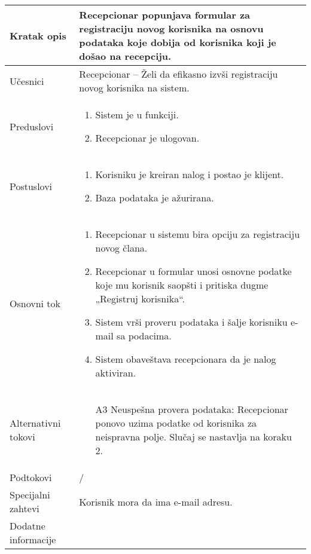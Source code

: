\documentclass[../main.tex]{subfiles}
\begin{document}
\begin{longtable}{| p{} | p{} |} 
\hline
    Kratak opis &  Recepcionar popunjava formular za registraciju novog korisnika na osnovu podataka koje dobija od korisnika koji je došao na recepciju.\\ 
\hline    
    Učesnici & 
         Recepcionar – Želi da efikasno izvši registraciju novog korisnika na sistem.
    \\
\hline
   Preduslovi & \begin{enumerate}
       \item Sistem je u funkciji.
       \item Recepcionar je ulogovan.
   \end{enumerate}\\
\hline  
    Postuslovi & \begin{enumerate}
        \item Korisniku je kreiran nalog i postao je klijent.
        \item Baza podataka je ažurirana.
    \end{enumerate}\\
\hline
    Osnovni tok & \begin{enumerate}
        \item Recepcionar u sistemu bira opciju za registraciju novog člana.
        \item Recepcionar u formular unosi osnovne podatke koje mu korisnik saopšti i pritiska dugme „Registruj korisnika“.
        \item Sistem vrši proveru podataka i šalje korisniku e-mail sa podacima.
        \item Sistem obaveštava recepcionara da je nalog aktiviran.
    \end{enumerate}\\
\hline
    Alternativni tokovi & \begin{itemize}
        \item[A3] Neuspešna provera podataka: Recepcionar ponovo uzima podatke od korisnika za neispravna polje. Slučaj se nastavlja na koraku 2.
    \end{itemize}\\
\hline
    Podtokovi & /\\
\hline
    Specijalni zahtevi & Korisnik mora da ima e-mail adresu.\\
\hline
    Dodatne informacije & \begin{itemize}

\end{itemize}
\end{longtable}
\end{document}
